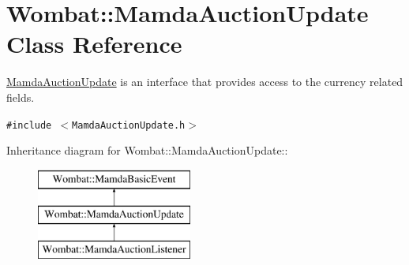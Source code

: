\hypertarget{classWombat_1_1MamdaAuctionUpdate}{
\section{Wombat::Mamda\-Auction\-Update Class Reference}
\label{classWombat_1_1MamdaAuctionUpdate}
}
\hyperlink{classWombat_1_1MamdaAuctionUpdate}{Mamda\-Auction\-Update} is an interface that provides access to the currency related fields.  


{\tt \#include $<$Mamda\-Auction\-Update.h$>$}

Inheritance diagram for Wombat::Mamda\-Auction\-Update::\begin{figure}[H]
\begin{center}
\leavevmode
\includegraphics[height=3cm]{classWombat_1_1MamdaAuctionUpdate}
\end{center}
\end{figure}
